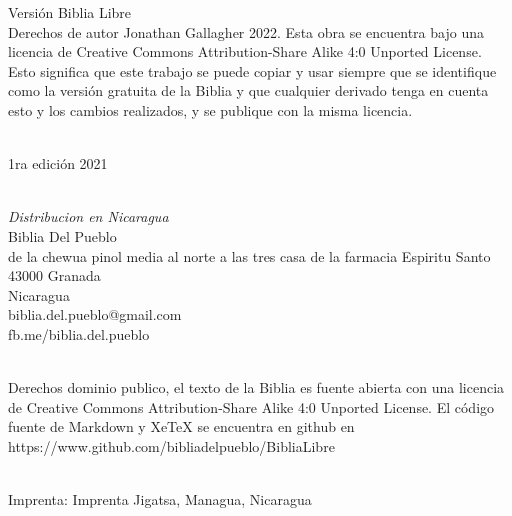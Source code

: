 \hfill\break
Versión Biblia Libre\\
Derechos de autor Jonathan Gallagher 2022. Esta obra se encuentra bajo
una licencia de Creative Commons Attribution-Share Alike 4:0 Unported
License. Esto significa que este trabajo se puede copiar y usar siempre
que se identifique como la versión gratuita de la Biblia y que cualquier
derivado tenga en cuenta esto y los cambios realizados, y se publique
con la misma licencia.\\
\strut \\
1ra edición 2021\\
\strut \\
\emph{Distribucion en Nicaragua}\\
Biblia Del Pueblo\\
de la chewua pinol media al norte a las tres casa de la farmacia
Espiritu Santo\\
43000 Granada\\
Nicaragua\\
biblia.del.pueblo@gmail.com\\
fb.me/biblia.del.pueblo\\
\strut \\
Derechos dominio publico, el texto de la Biblia es fuente abierta con
una licencia de Creative Commons Attribution-Share Alike 4:0 Unported
License. El código fuente de Markdown y XeTeX se encuentra en github
en\\
https://www.github.com/bibliadelpueblo/BibliaLibre\\
\strut \\
Imprenta: Imprenta Jigatsa, Managua, Nicaragua\\
